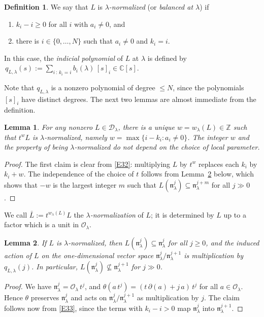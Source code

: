 \documentclass[11pt,reqno]{amsart}
\theoremstyle{plain}
\newtheorem{lemma}{Lemma}[section]
\theoremstyle{definition}
\newtheorem{definition}{Definition}
\theoremstyle{remark}
\numberwithin{equation}{section}
\newcommand{\cD}{\mathcal{D}}
\newcommand{\cO}{\mathcal{O}}
\newcommand{\C}{\mathbb{C}}
\newcommand{\Z}{\mathbb{Z}}
\newcommand{\del}{\partial}
\newcommand{\nl}{\mathfrak{n}_\lambda}
\newcommand{\ff}[2]{[#1]_{#2}}          %
\begin{document}
\begin{definition}
\label{D4}
We say that $L$ is \emph{$\lambda$-normalized} (or \emph{balanced at $\lambda$}) if
\begin{enumerate}
\item[$(a)$] $k_i - i \ge 0$ for all $i$ with $a_i \ne 0$, and
\item[$(b)$] there is $i \in \{0, \ldots, N\}$ such that $a_i \ne 0$ and $k_i = i$.
\end{enumerate}
In this case, the \emph{indicial polynomial} of $L$ at $\lambda$ is defined by
$\,q_{L,\lambda}(s) := \sum_{i \,:\, k_i = i} b_i(\lambda)\, \ff{s}{i} \in \C[s]$.
\end{definition}

Note that $q_{L,\lambda}$ is a nonzero polynomial of degree $\le N$, since the polynomials
$\ff{s}{i}$ have distinct degrees. The next two lemmas are almost immediate from the definition.

\begin{lemma}
\label{L3.1}
For any nonzero $L \in \cD_\lambda$, there is a unique $w = w_\lambda(L) \in \Z$ such that
$t^{w} L$ is $\lambda$-normalized, namely $w = \max\{ i - k_i : a_i \ne 0\}$. The integer $w$ and
the property of being $\lambda$-normalized do not depend on the choice of local parameter.
\end{lemma}

\begin{proof}
The first claim is clear from \eqref{E32}: multiplying $L$ by $t^w$ replaces each $k_i$ by
$k_i + w$. The independence of the choice of $t$ follows from Lemma~\ref{L3.2} below, which shows
that $-w$ is the largest integer $m$ such that $L(\nl^j) \subseteq \nl^{j+m}$ for all
$j \gg 0$.
\end{proof}

We call $\bar L := t^{w_\lambda(L)} L$ the \emph{$\lambda$-normalization} of $L$; it is determined
by $L$ up to a factor which is a unit in $\cO_\lambda$.

\begin{lemma}
\label{L3.2}
If $L$ is $\lambda$-normalized, then $L(\nl^j) \subseteq \nl^j$ for all $j \ge 0$, and the induced
action of $L$ on the one-dimensional vector space $\nl^j/\nl^{j+1}$ is multiplication by
$q_{L,\lambda}(j)$. In particular, $L(\nl^j) \not\subseteq \nl^{j+1}$ for $j \gg 0$.
\end{lemma}

\begin{proof}
We have $\nl^j = \cO_\lambda\, t^j$, and $\theta(a\, t^j) = (t\,\del(a) + j\,a)\, t^j$ for all
$a \in \cO_\lambda$. Hence $\theta$ preserves $\nl^j$ and acts on $\nl^j/\nl^{j+1}$ as
multiplication by $j$. The claim follows now from \eqref{E33}, since the terms with $k_i - i > 0$
map $\nl^j$ into $\nl^{j+1}$.
\end{proof}
\end{document}
